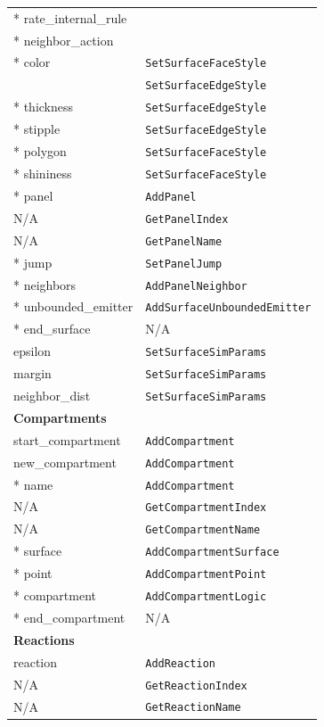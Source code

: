 \documentclass {scrbook}
\newcommand {\ttt} {\texttt}
\begin{document}
\begin{longtable}[c]{ll}
{*} rate\_internal\_rule \\ %
{*} neighbor\_action \\ %
{*} color & \ttt{SetSurfaceFaceStyle}\\
& \ttt{SetSurfaceEdgeStyle}\\
{*} thickness & \ttt{SetSurfaceEdgeStyle}\\
{*} stipple & \ttt{SetSurfaceEdgeStyle}\\
{*} polygon & \ttt{SetSurfaceFaceStyle}\\
{*} shininess & \ttt{SetSurfaceFaceStyle}\\
{*} panel & \ttt{AddPanel}\\
N/A & \ttt{GetPanelIndex}\\
N/A & \ttt{GetPanelName}\\
{*} jump & \ttt{SetPanelJump}\\
{*} neighbors & \ttt{AddPanelNeighbor}\\
{*} unbounded\_emitter & \ttt{AddSurfaceUnboundedEmitter}\\
{*} end\_surface & N/A\\
epsilon & \ttt{SetSurfaceSimParams}\\
margin & \ttt{SetSurfaceSimParams}\\
neighbor\_dist & \ttt{SetSurfaceSimParams}\\
\hline
\multicolumn{2}{l}{\hspace{0.3in}\textbf{Compartments}}\\
\hline
start\_compartment & \ttt{AddCompartment}\\
new\_compartment & \ttt{AddCompartment}\\
{*} name & \ttt{AddCompartment}\\
N/A & \ttt{GetCompartmentIndex}\\
N/A & \ttt{GetCompartmentName}\\
{*} surface & \ttt{AddCompartmentSurface}\\
{*} point & \ttt{AddCompartmentPoint}\\
{*} compartment & \ttt{AddCompartmentLogic}\\
{*} end\_compartment & N/A\\
\hline
\multicolumn{2}{l}{\hspace{0.3in}\textbf{Reactions}}\\
\hline
reaction & \ttt{AddReaction}\\
N/A & \ttt{GetReactionIndex}\\
N/A & \ttt{GetReactionName}\\

\end{longtable}
\end{document}
